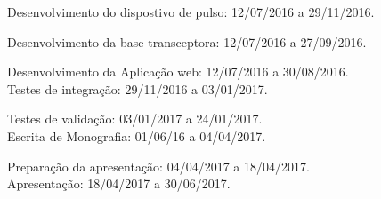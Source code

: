 \documentclass[a4paper]{article}
\begin{document}
Desenvolvimento do dispostivo de pulso: 12/07/2016 a 29/11/2016.

Desenvolvimento da base transceptora: 12/07/2016 a 27/09/2016.

Desenvolvimento da Aplicação web: 12/07/2016 a 30/08/2016. \\

Testes de integração: 29/11/2016 a 03/01/2017.

Testes de validação: 03/01/2017 a 24/01/2017. \\

Escrita de Monografia: 01/06/16 a 04/04/2017.

Preparação da apresentação: 04/04/2017 a 18/04/2017. \\

Apresentação: 18/04/2017 a 30/06/2017.
\end{document}
